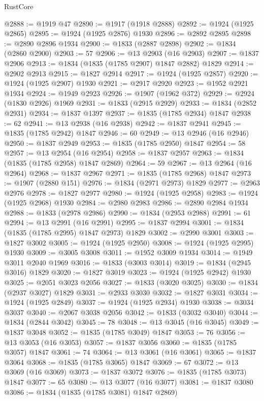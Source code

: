 \begin{lexlean}{RustCore}
\begin{coremodule}
@2888 := @1919 @47
@2890 := @1917 (@1918 @2888)
@2892 := @1924 (@1925 @2865)
@2895 := @1924 (@1925 @2876) @1930
@2896 := @2892 @2895
@2898 := @2890 @2896 @1934
@2900 := @1833 (@2887 @2898)
@2902 := @1834 (@2860 @2900)
@2903 := 57
@2906 := @13 @2903 (@16 @2903)
@2907 := @1837 @2906
@2913 := @1834 (@1835 (@1785 @2907) @1847 @2882) @1829
@2914 := @2902 @2913
@2915 := @1827 @2914
@2917 := @1924 (@1925 @2857)
@2920 := @1924 (@1925 @2907) @1930
@2921 := @2917 @2920
@2923 := @1952 @2921 @1934
@2924 := @1949 @2923
@2926 := @1907 (@1962 @372)
@2929 := @2924 (@1830 @2926) @1969
@2931 := @1833 (@2915 @2929)
@2933 := @1834 (@2852 @2931)
@2934 := @1837 @1397
@2937 := @1835 (@1785 @2934) @1847
@2938 := 62
@2941 := @13 @2938 (@16 @2938)
@2942 := @1837 @2941
@2945 := @1835 (@1785 @2942) @1847
@2946 := 60
@2949 := @13 @2946 (@16 @2946)
@2950 := @1837 @2949
@2953 := @1835 (@1785 @2950) @1847
@2954 := 58
@2957 := @13 @2954 (@16 @2954)
@2958 := @1837 @2957
@2963 := @1834 (@1835 (@1785 @2958) @1847 @2869)
@2964 := 59
@2967 := @13 @2964 (@16 @2964)
@2968 := @1837 @2967
@2971 := @1835 (@1785 @2968) @1847
@2973 := @1907 (@2880 @151)
@2976 := @1834 (@2971 @2973) @1829
@2977 := @2963 @2976
@2978 := @1827 @2977
@2980 := @1924 (@1925 @2958)
@2983 := @1924 (@1925 @2968) @1930
@2984 := @2980 @2983
@2986 := @2890 @2984 @1934
@2988 := @1833 (@2978 @2986)
@2990 := @1834 (@2953 @2988)
@2991 := 61
@2994 := @13 @2991 (@16 @2991)
@2995 := @1837 @2994
@3001 := @1834 (@1835 (@1785 @2995) @1847 @2973) @1829
@3002 := @2990 @3001
@3003 := @1827 @3002
@3005 := @1924 (@1925 @2950)
@3008 := @1924 (@1925 @2995) @1930
@3009 := @3005 @3008
@3011 := @1952 @3009 @1934
@3014 := @1949 @3011 @2040 @1969
@3016 := @1833 (@3003 @3014)
@3019 := @1834 (@2945 @3016) @1829
@3020 := @1827 @3019
@3023 := @1924 (@1925 @2942) @1930
@3025 := @2051 @3023 @2056
@3027 := @1833 (@3020 @3025)
@3030 := @1834 (@2937 @3027) @1829
@3031 := @2933 @3030
@3032 := @1827 @3031
@3034 := @1924 (@1925 @2849)
@3037 := @1924 (@1925 @2934) @1930
@3038 := @3034 @3037
@3040 := @2067 @3038 @2056
@3042 := @1833 (@3032 @3040)
@3044 := @1834 (@2844 @3042)
@3045 := 78
@3048 := @13 @3045 (@16 @3045)
@3049 := @1837 @3048
@3052 := @1835 (@1785 @3049) @1847
@3053 := 76
@3056 := @13 @3053 (@16 @3053)
@3057 := @1837 @3056
@3060 := @1835 (@1785 @3057) @1847
@3061 := 74
@3064 := @13 @3061 (@16 @3061)
@3065 := @1837 @3064
@3068 := @1835 (@1785 @3065) @1847
@3069 := 67
@3072 := @13 @3069 (@16 @3069)
@3073 := @1837 @3072
@3076 := @1835 (@1785 @3073) @1847
@3077 := 65
@3080 := @13 @3077 (@16 @3077)
@3081 := @1837 @3080
@3086 := @1834 (@1835 (@1785 @3081) @1847 @2869)

\end{coremodule}
\end{lexlean}
